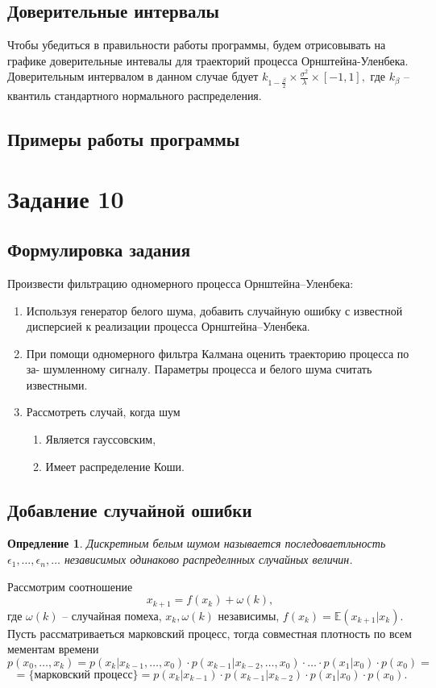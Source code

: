 \documentclass[11pt]{article}
\newtheorem{definition}{Опредление}
\numberwithin{equation}{section}
\begin{document}
\subsection{Доверительные интервалы}
Чтобы убедиться в правильности работы программы, будем отрисовывать на графике доверительные интевалы для траекторий процесса 
Орнштейна-Уленбека. Доверительным интервалом в данном случае бдует 
$k_{1-\frac{\beta}{2}} \times \frac{\sigma^2}{\lambda} \times [-1, 1],$ где $k_{\beta}$ --
квантиль стандартного нормального распределения.
\subsection{Примеры работы программы}


\section{Задание 10}
\subsection{Формулировка задания}
Произвести фильтрацию одномерного процесса Орнштейна–Уленбека:
\begin{enumerate}
  \item  Используя генератор белого шума, добавить случайную ошибку с известной дисперсией к реализации процесса Орнштейна–Уленбека.
  \item  При помощи одномерного фильтра Калмана оценить траекторию процесса по за- шумленному сигналу. Параметры процесса и белого шума считать известными.
  \item   Рассмотреть случай, когда шум
  \begin{enumerate}
    \item Является гауссовским,
    \item Имеет распределение Коши.
  \end{enumerate}
\end{enumerate}
\subsection{Добавление случайной ошибки}
\begin{definition}
  Дискретным белым шумом называется последоваетльность 
  $\epsilon_1, \dots, \epsilon_n, \dots$ независимых одинаково распределнных случайных величин.
\end{definition}
Рассмотрим соотношение 
$$ x_{k+1} = f(x_k) + \omega(k),$$
где $\omega(k)$ -- случайная помеха, $x_k, \omega(k)$  независимы, 
$f(x_k) = \mathbb{E}(x_{k+1}|x_k).$ Пусть рассматриваеться марковский процесс, тогда 
совместная плотность по всем мементам времени 
$$ p(x_0, \dots, x_k) = p(x_k|x_{k-1}, \dots, x_0) \cdot  p(x_{k-1}|x_{k-2}, \dots, x_0)\cdot \dots \cdot p(x_1|x_0) \cdot p(x_0)=$$
$$=\{\text{марковский процесс} \} = p(x_{k}|x_{k-1}) \cdot p(x_{k-1}|x_{k-2}) \cdot p(x_{1}|x_{0}) \cdot p(x_0).$$
\end{document}
